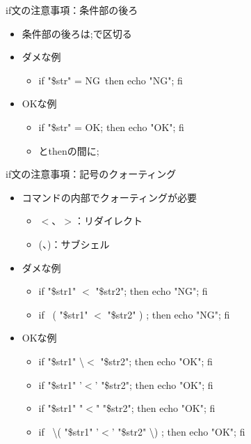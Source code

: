 \documentclass[12pt,aspectratio=169]{beamer}
\begin{document}
\begin{frame}{if文の注意事項：条件部の後ろ}

  \begin{itemize}
    \item 条件部の後ろは;で区切る
    \item ダメな例
    \begin{itemize}
      \item if \lbrack "\$str" = NG\rbrack\ then echo "NG"; fi
    \end{itemize}
    \item OKな例
    \begin{itemize}
      \item if \lbrack "\$str" = OK\rbrack ; then echo "OK"; fi
      \item \rbrack とthenの間に;
    \end{itemize}

  \end{itemize}

\end{frame}

\begin{frame}{if文の注意事項：記号のクォーティング}

  \begin{itemize}
    \item \lbrack コマンドの内部でクォーティングが必要
    \begin{itemize}
      \item $<$、$>$：リダイレクト
      \item (、)：サブシェル
    \end{itemize}
    \item ダメな例
    \begin{itemize}
      \item if \lbrack "\$str1" $<$ "\$str2"\rbrack ; then echo "NG"; fi
      \item if \lbrack\ ( "\$str1" $<$ "\$str2" ) \rbrack ; then echo "NG"; fi
    \end{itemize}
    \item OKな例
    \begin{itemize}
      \item if \lbrack "\$str1" \textbackslash$<$ "\$str2"\rbrack ; then echo "OK"; fi
      \item if \lbrack "\$str1" '$<$' "\$str2"\rbrack ; then echo "OK"; fi
      \item if \lbrack "\$str1" "$<$" "\$str2"\rbrack ; then echo "OK"; fi
      \item if \lbrack\ \textbackslash( "\$str1" '$<$' "\$str2" \textbackslash) \rbrack ; then echo "OK"; fi
    \end{itemize}

  \end{itemize}

\end{frame}
\end{document}
